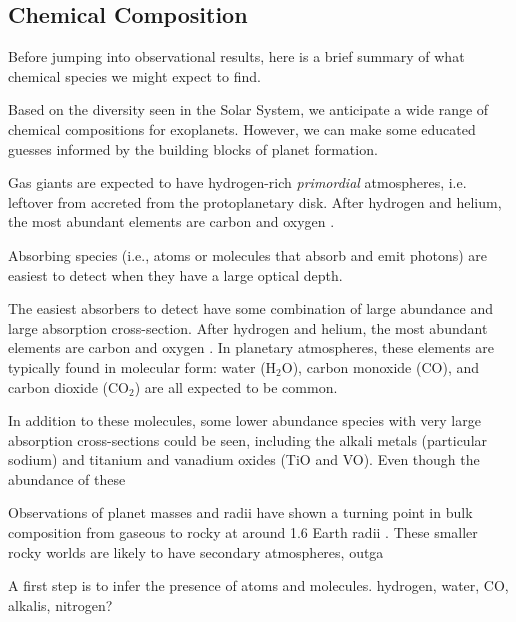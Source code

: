 \documentclass[graybox,natbib,nosecnum]{svmult}
\begin{document}
\subsection{Chemical Composition}
Before jumping into observational results, here is a brief summary of what chemical species we might expect to find. 

Based on the diversity seen in the Solar System, we anticipate a wide range of chemical compositions for exoplanets. However, we can make some educated guesses informed by the building blocks of planet formation. 

Gas giants are expected to have hydrogen-rich \emph{primordial} atmospheres, i.e. leftover from accreted from the protoplanetary disk.  After hydrogen and helium, the most abundant elements are carbon and oxygen \citep{anders89}. 

Absorbing species (i.e., atoms or molecules that absorb and emit photons) are easiest to detect when they have a large optical depth. 

The easiest absorbers to detect have some combination of large abundance and large absorption cross-section.  After hydrogen and helium, the most abundant elements are carbon and oxygen \citep{anders89}.  In planetary atmospheres, these elements are typically found in molecular form: water (H$_2$O), carbon monoxide (CO), and carbon dioxide (CO$_2$) are all expected to be common. 

In addition to these molecules, some lower abundance species with very large absorption cross-sections could be seen, including the alkali metals (particular sodium) and titanium and vanadium oxides (TiO and VO). Even though the abundance of these 



Observations of planet masses and radii have shown a turning point in bulk composition from gaseous to rocky at around 1.6 Earth radii \citep{weiss14, rogers15}. These smaller rocky worlds are likely to have secondary atmospheres, outga

A first step is to infer the presence of atoms and molecules. 
hydrogen, water, CO, alkalis, nitrogen?



\end{document}
